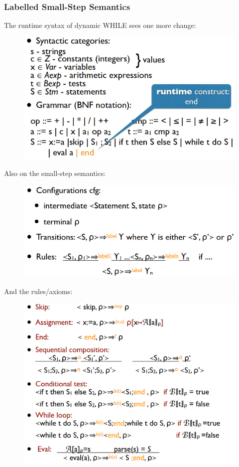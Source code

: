\documentclass[10pt,a4paper]{report}
\begin{document}
\subsubsection{Labelled Small-Step Semantics}
The runtime syntax of dynamic WHILE sees one more change:
\begin{figure}[H]
\centering
\includegraphics[scale=0.4]{29.png}
\end{figure}
Also on the small-step semantics:
\begin{figure}[H]
\centering
\includegraphics[scale=0.4]{30.png}
\end{figure}
And the rules/axioms:
\begin{figure}[H]
\centering
\includegraphics[scale=0.4]{31.png}
\end{figure}
\end{document}
